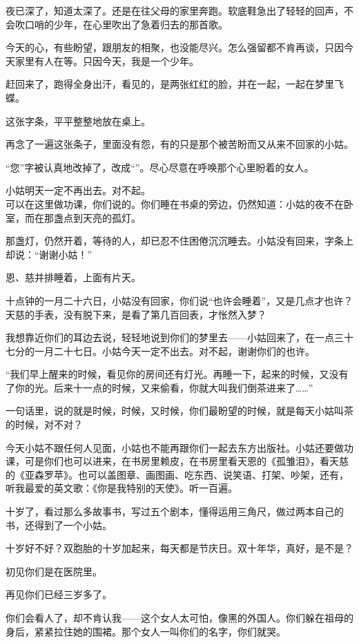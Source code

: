 \par 夜已深了，知道太深了。还是在往父母的家里奔跑。软底鞋急出了轻轻的回声，不会吹口哨的少年，在心里吹出了急着归去的那首歌。
\par 今天的心，有些盼望，跟朋友的相聚，也没能尽兴。怎么强留都不肯再谈，只因今天家里有人在等。只因今天，我是一个少年。
\par 赶回来了，跑得全身出汗，看见的，是两张红红的脸，并在一起，一起在梦里飞蝶。
\par 这张字条，平平整整地放在桌上。
\par 再念了一遍这张条子，里面没有怨，有的只是那个被苦盼而又从来不回家的小姑。
\par “您”字被认真地改掉了，改成“\NiXin ”。尽心尽意在呼唤那个心里盼着的女人。
\par 小姑明天一定不再出去。对不起。
\\ \NiXin 可以在这里做功课，你们说的。你们睡在书桌的旁边，仍然知道：小姑的夜不在卧室，而在那盏点到天亮的孤灯。
\par 那盏灯，仍然开着，等待的人，却已忍不住困倦沉沉睡去。小姑没有回来，字条上却说：“谢谢小姑！”
\par 恩、慈并排睡着，上面有片天。
\par 十点钟的一月二十六日，小姑没有回家，你们说“也许会睡着”，又是几点才也许？天慈的手表，没有脱下来，是看了第几百回表，才怅然入梦？
\par 我想靠近你们的耳边去说，轻轻地说到你们的梦里去——小姑回来了，在一点三十七分的一月二十七日。小姑今天一定不出去。对不起，谢谢你们的也许。
\par “我们早上醒来的时候，看见你的房间还有灯光。再睡一下，起来的时候，又没有了你的光。后来十一点的时候，又来偷看，你就大叫我们倒茶进来了……”
\par 一句话里，说的就是时候，时候，又时候，你们最盼望的时候，就是每天小姑叫茶的时候，对不对？
\par 今天小姑不跟任何人见面，小姑也不能再跟你们一起去东方出版社。小姑还要做功课，可是你们也可以进来，在书房里赖皮，在书房里看天恩的《孤雏泪》，看天慈的《亚森罗苹》。也可以盖图章、画图画、吃东西、说笑语、打架、吵架，还有，听我最爱的英文歌：《你是我特别的天使》。听一百遍。
\par 十岁了，看过那么多故事书，写过五个剧本，懂得运用三角尺，做过两本自己的书，还得到了一个小姑。
\par 十岁好不好？双胞胎的十岁加起来，每天都是节庆日。双十年华，真好，是不是？
\par 初见你们是在医院里。
\par 再见你们已经三岁多了。
\par 你们会看人了，却不肯认我——这个女人太可怕，像黑的外国人。你们躲在祖母的身后，紧紧拉住她的围裙。那个女人一叫你们的名字，你们就哭。
